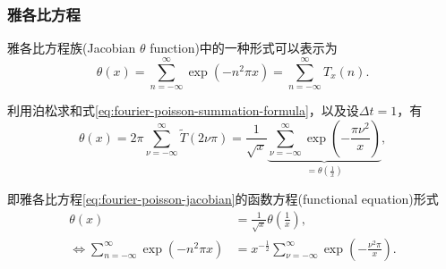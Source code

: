 

  \subsubsection{雅各比方程}
  \label{sec:fourier-poisson-jacobian}
  雅各比方程族(Jacobian $\theta$ function)中的一种形式可以表示为
  \begin{equation}
    \label{eq:fourier-poisson-jacobian}
    \theta(x) = \sum_{n = - \infty}^{\infty}
    \exp \left( - n^{2} \pi x \right)
    = \sum_{n = - \infty}^{\infty} T_{x}(n).
  \end{equation}

利用泊松求和式\eqref{eq:fourier-poisson-summation-formula}，以及设$\Delta t = 1$，有
\begin{equation}
  \label{eq:fourier-poisson-jacobian-2}
  \theta(x) = 2 \pi \sum_{\nu = - \infty}^{\infty} \widetilde{T} \left( 2 \nu \pi \right)
  = \frac{1}{\sqrt{x}}
  \underbrace{
  \sum_{\nu = - \infty}^{\infty}
  \exp \left(
   - \frac{\pi \nu^{2}}{x}
  \right)
  }_{= \theta \left( \frac{1}{x} \right)},
\end{equation}

即雅各比方程\eqref{eq:fourier-poisson-jacobian}的函数方程(functional equation)形式
\begin{equation}
  \label{eq:fourier-poisson-jacobian-equiv}
  \begin{split}
    \theta \left( x \right) & = \frac{1}{\sqrt{x}} \theta \left( \frac{1}{x} \right),\\
    \Leftrightarrow \sum_{n = - \infty}^{\infty}
    \exp \left( - n^{2} \pi x \right) & = x^{-\frac{1}{2}} \sum_{\nu = - \infty}^{\infty} \exp \left( - \frac{\nu^{2} \pi }{x} \right).
  \end{split}
\end{equation}

